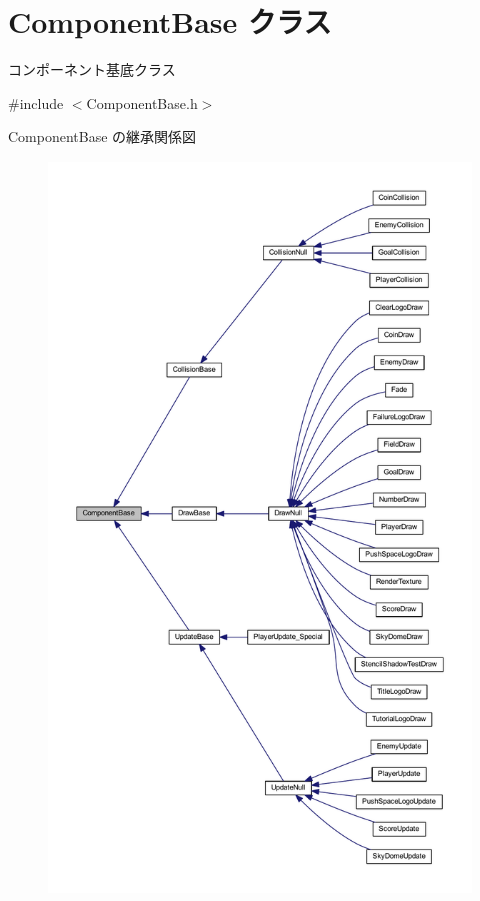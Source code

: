 \hypertarget{class_component_base}{}\section{Component\+Base クラス}
\label{class_component_base}


コンポーネント基底クラス  




{\ttfamily \#include $<$Component\+Base.\+h$>$}



Component\+Base の継承関係図
\nopagebreak
\begin{figure}[H]
\begin{center}
\leavevmode
\includegraphics[height=550pt]{class_component_base__inherit__graph}
\end{center}
\end{figure}


